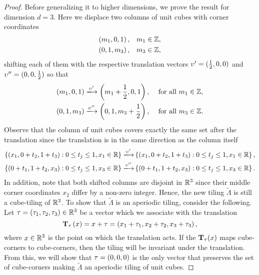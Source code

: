 \documentclass[../thesis.tex]{subfiles}
\begin{document}
\begin{proof}
Before generalizing it to higher dimensions, we prove the result for dimension $d=3$. Here we displace two columns of unit cubes with corner coordinates 
\begin{align*}
    \left(m_1,0,1\right),& \quad m_1 \in \mathbb{Z},\\
    \left(0,1,m_3\right),& \quad m_3 \in \mathbb{Z},
\end{align*}
shifting each of them with the respective translation vectors $\upsilon' = (\frac{1}{2},0,0)$ and $\upsilon'' = (0,0,\frac{1}{2})$ so that
\begin{align*}
    \bracMed{m_1,0,1} \xlongrightarrow[]{\upsilon'} \bracMed{m_1 + \frac{1}{2} ,0,1}, \quad  &\text{ for all } m_1 \in \Z,\\
    \bracMed{0,1,m_3} \xlongrightarrow[]{\upsilon''} \bracMed{0,1,m_3 + \frac{1}{2} },    \quad  &\text{ for all }  m_3 \in \Z.
\end{align*}
Observe that the column of unit cubes covers exactly the same set after the translation since the translation is in the same direction as the column itself
\begin{align*}
    \braqMed{ \bracMed{x_1, 0+t_2,1+t_3} : 0 \leq t_j \leq 1, x_1\in\R} \xlongrightarrow[]{\upsilon'} & \braqMed{ \bracMed{x_1, 0+t_2,1+t_3} : 0 \leq t_j \leq 1, x_1\in\R},\\
    \braqMed{ \bracMed{0+t_1,1+t_2,x_3} : 0 \leq t_j \leq 1, x_3\in\R} \xlongrightarrow[]{\upsilon''} & \braqMed{ \bracMed{0+t_1,1+t_2,x_3} : 0 \leq t_j \leq 1, x_3\in\R}.
\end{align*}
In addition, note that both shifted columns are disjoint in $\mathbb{R}^3$ since their middle corner coordinates $x_2$ differ by a non-zero integer. Hence, the new tiling $\widetilde{\Lambda}$ is still a cube-tiling of $\mathbb{R}^3$. To show that $\widetilde{\Lambda}$ is an aperiodic tiling, consider the following. Let $\tau=(\tau_1,\tau_2,\tau_3)\in \mathbb{R}^3$ be a vector which we associate with the translation
\begin{equation*}
    \mathbf{T}_\tau \left(x\right) = x+\tau = \left(x_1+\tau_1, x_2+\tau_2, x_3+\tau_3\right),
\end{equation*}
where $x\in \mathbb{R}^3$ is the point on which the translation acts. If the $\mathbf{T}_\tau (x)$ maps cube-corners to cube-corners, then the tiling will be invariant under the translation. From this, we will show that $\tau=(0,0,0)$ is the only vector that preserves the set of cube-corners making $\widetilde{\Lambda}$ an aperiodic tiling of unit cubes. 


\end{proof}
\end{document}

